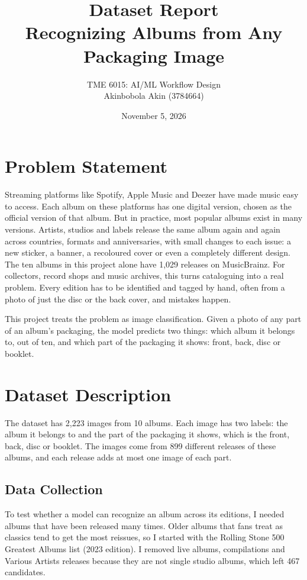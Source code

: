 \documentclass[10pt,a4paper,twocolumn]{article}
\title{\textbf{Dataset Report}\\Recognizing Albums from Any Packaging Image}
\author{
    TME 6015: AI/ML Workflow Design\\[6pt]
    Akinbobola Akin (3784664)
}
\date{November 5, 2026}
\begin{document}
\maketitle\tableofcontents\clearpage

\section{Problem Statement}
Streaming platforms like Spotify, Apple Music and Deezer have made music easy to access. Each album on these platforms has one digital version, chosen as the official version of that album. But in practice, most popular albums exist in many versions. Artists, studios and labels release the same album again and again across countries, formats and anniversaries, with small changes to each issue: a new sticker, a banner, a recoloured cover or even a completely different design. The ten albums in this project alone have 1,029 releases on MusicBrainz. For collectors, record shops and music archives, this turns cataloguing into a real problem. Every edition has to be identified and tagged by hand, often from a photo of just the disc or the back cover, and mistakes happen.

This project treats the problem as image classification. Given a photo of any part of an album's packaging, the model predicts two things: which album it belongs to, out of ten, and which part of the packaging it shows: front, back, disc or booklet.

\section{Dataset Description}
The dataset has 2,223 images from 10 albums. Each image has two labels: the album it belongs to and the part of the packaging it shows, which is the front, back, disc or booklet. The images come from 899 different releases of these albums, and each release adds at most one image of each part.

\subsection{Data Collection}
To test whether a model can recognize an album across its editions, I needed albums that have been released many times. Older albums that fans treat as classics tend to get the most reissues, so I started with the Rolling Stone 500 Greatest Albums list (2023 edition). I removed live albums, compilations and Various Artists releases because they are not single studio albums, which left 467 candidates.
\end{document}

